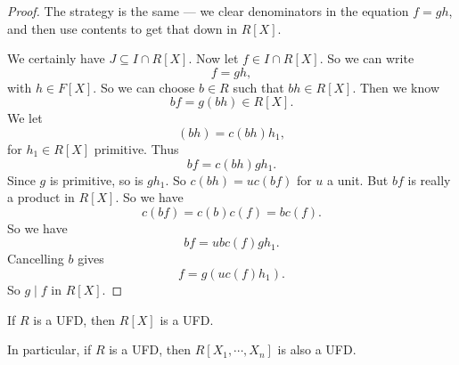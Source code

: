 \documentclass[a4paper]{article}
\begin{document}
\begin{proof}
  The strategy is the same --- we clear denominators in the equation $f = gh$, and then use contents to get that down in $R[X]$.

  We certainly have $J \subseteq I \cap R[X]$. Now let $f \in I \cap R[X]$. So we can write
  \[
    f = gh,
  \]
  with $h \in F[X]$. So we can choose $b \in R$ such that $bh \in R[X]$. Then we know
  \[
    bf = g(bh) \in R[X].
  \]
  We let
  \[
    (bh) = c(bh) h_1,
  \]
  for $h_1 \in R[X]$ primitive. Thus
  \[
    bf = c(bh) g h_1.
  \]
  Since $g$ is primitive, so is $gh_1$. So $c(bh) = u c(bf)$ for $u$ a unit. But $b f$ is really a product in $R[X]$. So we have
  \[
    c(bf) = c(b)c(f) = bc(f).
  \]
  So we have
  \[
    bf = ubc(f) g h_1.
  \]
  Cancelling $b$ gives
  \[
    f = g (uc(f)h_1).
  \]
  So $g \mid f$ in $R[X]$.
\end{proof}

\begin{thm}
  If $R$ is a UFD, then $R[X]$ is a UFD.
\end{thm}
In particular, if $R$ is a UFD, then $R[X_1, \cdots, X_n]$ is also a UFD.
\end{document}
